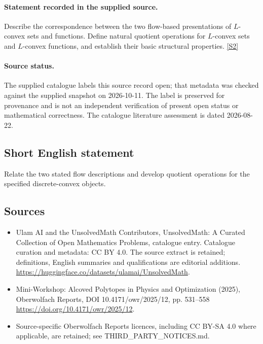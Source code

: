 \documentclass[11pt]{article}
\begin{document}
\paragraph{Statement recorded in the supplied source.}
Describe the correspondence between the two flow-based presentations of $L$-convex sets and functions. Define natural quotient operations for $L$-convex sets and $L$-convex functions, and establish their basic structural properties. \href{https://doi.org/10.4171/owr/2025/12}{[S2]}
\paragraph{Source status.}
The supplied catalogue labels this source record open; that metadata was checked against the supplied snapshot on 2026-10-11. The label is preserved for provenance and is not an independent verification of present open status or mathematical correctness. The catalogue literature assessment is dated 2026-08-22.
\subsection{Short English statement}
Relate the two stated flow descriptions and develop quotient operations for the specified discrete-convex objects.
\subsection{Sources}
\begin{itemize}
\item[S1] Ulam AI and the UnsolvedMath Contributors, UnsolvedMath: A Curated Collection of Open Mathematics Problems, catalogue entry. Catalogue curation and metadata: CC BY 4.0. The source extract is retained; definitions, English summaries and qualifications are editorial additions.
\url{https://huggingface.co/datasets/ulamai/UnsolvedMath}.
\item[S2] Mini-Workshop: Alcoved Polytopes in Physics and Optimization (2025), Oberwolfach Reports, DOI 10.4171/owr/2025/12, pp. 531--558
\url{https://doi.org/10.4171/owr/2025/12}.
\item Source-specific Oberwolfach Reports licences, including CC BY-SA 4.0 where applicable, are retained; see THIRD\_PARTY\_NOTICES.md.
\end{itemize}
\end{document}
